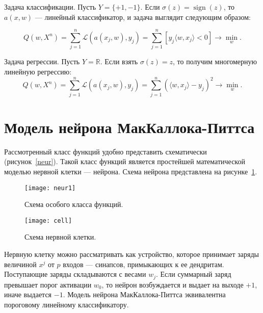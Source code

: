 \documentclass[specialist, 12pt, 
subf, %
href, colorlinks=true,
substylefile = spbu.rtx,
]{disser}
\DeclareMathOperator{\sign}{sign}
\begin{document}
	Задача классификации. Пусть $Y=\{+1,-1\}$. Если $\sigma (z)=\sign (z)$, то $a(x,w)$ --- линейный классификатор, и задача выглядит следующим образом: 
	
	\begin{equation*}
	Q(w, X^{n})=\sum_{j=1}^{n} \mathcal{L} \left( a(x_j ,w), y_j \right) = \sum_{j=1}^{n} [y_j \langle w,x_j \rangle  < 0] \rightarrow \min_{w}.
	\end{equation*}
	
	Задача регрессии. Пусть $Y=\mathbb{R}$. Если взять $\sigma(z)=z$, то получим многомерную линейную регрессию:
	\begin{equation*}
	Q(w, X^{n})=\sum_{j=1}^{n} \mathcal{L} \left( a( x_j,w ), y_j \right)=\sum_{j=1}^{n}\left( \langle w,x_j \rangle  -y_j \right)^2 \rightarrow \min_{w}.
	\end{equation*}
	
	\section{Модель нейрона МакКаллока-Питтса}
	
	Рассмотренный класс функций удобно представить схематически (рисунок~\ref{neur}). Такой класс функций является простейшей математической моделью нервной клетки --- нейрона. Схема нейрона представлена на рисунке~\ref{cell}.
	
	\begin{figure}[h]
		\begin{center}
			\begin{minipage}[h]{0.5\linewidth}
				\texttt{[image: neur1]}
				\caption{Схема особого класса функций.} 
				\label{neur} 
			\end{minipage}
			\hfill
			\begin{minipage}[h]{0.45\linewidth}
				\texttt{[image: cell]}
				\caption{Схема нервной клетки.}
				\label{cell}
			\end{minipage}
		\end{center}
	\end{figure}


Нервную клетку можно рассматривать как устройство, которое принимает заряды величиной $x^j$ от $p$ входов --- синапсов, примыкающих к ее дендритам. Поступающие заряды складываются с весами $w_j$. Если суммарный заряд превышает порог активации $w_0$, то нейрон возбуждается и выдает на выходе $+1$, иначе выдается $-1$. Модель нейрона МакКаллока-Питтса эквивалентна пороговому линейному классификатору. 
	
\end{document}
